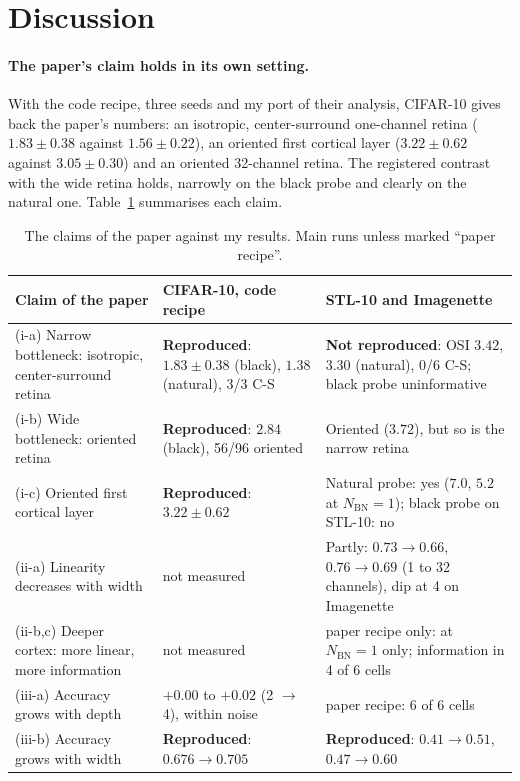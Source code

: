 \documentclass[11pt,a4paper]{article}
\newcommand{\NBN}{N_{\mathrm{BN}}}
\begin{document}
\FloatBarrier
\section{Discussion}\label{sec:disc}
\paragraph{The paper's claim holds in its own setting.} With the code recipe, three seeds and my port of their analysis, CIFAR-10 gives back the paper's numbers: an isotropic, center-surround one-channel retina ($1.83\pm0.38$ against $1.56\pm0.22$), an oriented first cortical layer ($3.22\pm0.62$ against $3.05\pm0.30$) and an oriented 32-channel retina. The registered contrast with the wide retina holds, narrowly on the black probe and clearly on the natural one. Table~\ref{tab:claims} summarises each claim.

\begin{table}[t]\centering\footnotesize
\begin{tabular}{p{4.2cm}p{4.6cm}p{5.6cm}}
\toprule
Claim of the paper & CIFAR-10, code recipe & STL-10 and Imagenette\\
\midrule
(i-a) Narrow bottleneck: isotropic, center-surround retina & \textbf{Reproduced}: $1.83\pm0.38$ (black), $1.38$ (natural), 3/3 C-S & \textbf{Not reproduced}: OSI $3.42$, $3.30$ (natural), 0/6 C-S; black probe uninformative\\
(i-b) Wide bottleneck: oriented retina & \textbf{Reproduced}: $2.84$ (black), 56/96 oriented & Oriented ($3.72$), but so is the narrow retina\\
(i-c) Oriented first cortical layer & \textbf{Reproduced}: $3.22\pm0.62$ & Natural probe: yes ($7.0$, $5.2$ at $\NBN=1$); black probe on STL-10: no\\
(ii-a) Linearity decreases with width & not measured & Partly: $0.73\to0.66$, $0.76\to0.69$ (1 to 32 channels), dip at 4 on Imagenette\\
(ii-b,c) Deeper cortex: more linear, more information & not measured & paper recipe only: at $\NBN=1$ only; information in 4 of 6 cells\\
(iii-a) Accuracy grows with depth & $+0.00$ to $+0.02$ (2 $\to$ 4), within noise & paper recipe: 6 of 6 cells\\
(iii-b) Accuracy grows with width & \textbf{Reproduced}: $0.676\to0.705$ & \textbf{Reproduced}: $0.41\to0.51$, $0.47\to0.60$\\
\bottomrule
\end{tabular}
\caption{The claims of the paper against my results. Main runs unless marked ``paper recipe''.}\label{tab:claims}
\end{table}
\end{document}
